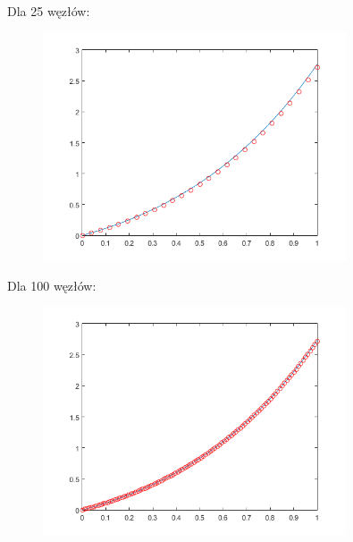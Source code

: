 \begin{samepage}
	Dla 25 węzłów:
	\begin{figure}[!ht]
		\begin{center}
			\includegraphics[width=0.8\textwidth]{Lab4/charts/zad4/2/25.png}
		\end{center}
	\end{figure}
	\FloatBarrier
\end{samepage}

\newpage
\begin{samepage}
	
	Dla 100 węzłów:
	\begin{figure}[!ht]
		\begin{center}
			\includegraphics[width=0.8\textwidth]{Lab4/charts/zad4/2/100.png}
		\end{center}
	\end{figure}
	\FloatBarrier
\end{samepage}

